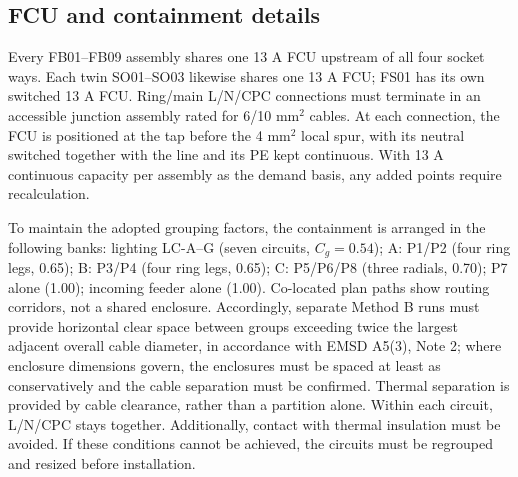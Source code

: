 \subsection*{FCU and containment details}
Every FB01--FB09 assembly shares one 13 A FCU upstream of all four socket ways. Each twin SO01--SO03 likewise shares one 13 A FCU; FS01 has its own switched 13 A FCU. Ring/main L/N/CPC connections must terminate in an accessible junction assembly rated for 6/10 mm$^2$ cables. At each connection, the FCU is positioned at the tap before the 4 mm$^2$ local spur, with its neutral switched together with the line and its PE kept continuous. With 13 A continuous capacity per assembly as the demand basis, any added points require recalculation.

To maintain the adopted grouping factors, the containment is arranged in the following banks: lighting LC-A--G (seven circuits, $C_g=0.54$); A: P1/P2 (four ring legs, 0.65); B: P3/P4 (four ring legs, 0.65); C: P5/P6/P8 (three radials, 0.70); P7 alone (1.00); incoming feeder alone (1.00). Co-located plan paths show routing corridors, not a shared enclosure. Accordingly, separate Method B runs must provide horizontal clear space between groups exceeding twice the largest adjacent overall cable diameter, in accordance with EMSD A5(3), Note 2; where enclosure dimensions govern, the enclosures must be spaced at least as conservatively and the cable separation must be confirmed. Thermal separation is provided by cable clearance, rather than a partition alone. Within each circuit, L/N/CPC stays together. Additionally, contact with thermal insulation must be avoided. If these conditions cannot be achieved, the circuits must be regrouped and resized before installation.
